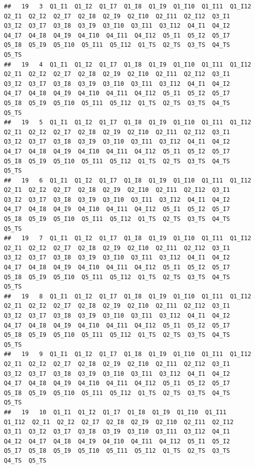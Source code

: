 \documentclass[]{book}
\begin{document}
\begin{verbatim}
##   19   3  Q1_I1  Q1_I2  Q1_I7  Q1_I8  Q1_I9  Q1_I10  Q1_I11  Q1_I12  Q2_I1  Q2_I2  Q2_I7  Q2_I8  Q2_I9  Q2_I10  Q2_I11  Q2_I12  Q3_I1  Q3_I2  Q3_I7  Q3_I8  Q3_I9  Q3_I10  Q3_I11  Q3_I12  Q4_I1  Q4_I2  Q4_I7  Q4_I8  Q4_I9  Q4_I10  Q4_I11  Q4_I12  Q5_I1  Q5_I2  Q5_I7  Q5_I8  Q5_I9  Q5_I10  Q5_I11  Q5_I12  Q1_TS  Q2_TS  Q3_TS  Q4_TS  Q5_TS
##   19   4  Q1_I1  Q1_I2  Q1_I7  Q1_I8  Q1_I9  Q1_I10  Q1_I11  Q1_I12  Q2_I1  Q2_I2  Q2_I7  Q2_I8  Q2_I9  Q2_I10  Q2_I11  Q2_I12  Q3_I1  Q3_I2  Q3_I7  Q3_I8  Q3_I9  Q3_I10  Q3_I11  Q3_I12  Q4_I1  Q4_I2  Q4_I7  Q4_I8  Q4_I9  Q4_I10  Q4_I11  Q4_I12  Q5_I1  Q5_I2  Q5_I7  Q5_I8  Q5_I9  Q5_I10  Q5_I11  Q5_I12  Q1_TS  Q2_TS  Q3_TS  Q4_TS  Q5_TS
##   19   5  Q1_I1  Q1_I2  Q1_I7  Q1_I8  Q1_I9  Q1_I10  Q1_I11  Q1_I12  Q2_I1  Q2_I2  Q2_I7  Q2_I8  Q2_I9  Q2_I10  Q2_I11  Q2_I12  Q3_I1  Q3_I2  Q3_I7  Q3_I8  Q3_I9  Q3_I10  Q3_I11  Q3_I12  Q4_I1  Q4_I2  Q4_I7  Q4_I8  Q4_I9  Q4_I10  Q4_I11  Q4_I12  Q5_I1  Q5_I2  Q5_I7  Q5_I8  Q5_I9  Q5_I10  Q5_I11  Q5_I12  Q1_TS  Q2_TS  Q3_TS  Q4_TS  Q5_TS
##   19   6  Q1_I1  Q1_I2  Q1_I7  Q1_I8  Q1_I9  Q1_I10  Q1_I11  Q1_I12  Q2_I1  Q2_I2  Q2_I7  Q2_I8  Q2_I9  Q2_I10  Q2_I11  Q2_I12  Q3_I1  Q3_I2  Q3_I7  Q3_I8  Q3_I9  Q3_I10  Q3_I11  Q3_I12  Q4_I1  Q4_I2  Q4_I7  Q4_I8  Q4_I9  Q4_I10  Q4_I11  Q4_I12  Q5_I1  Q5_I2  Q5_I7  Q5_I8  Q5_I9  Q5_I10  Q5_I11  Q5_I12  Q1_TS  Q2_TS  Q3_TS  Q4_TS  Q5_TS
##   19   7  Q1_I1  Q1_I2  Q1_I7  Q1_I8  Q1_I9  Q1_I10  Q1_I11  Q1_I12  Q2_I1  Q2_I2  Q2_I7  Q2_I8  Q2_I9  Q2_I10  Q2_I11  Q2_I12  Q3_I1  Q3_I2  Q3_I7  Q3_I8  Q3_I9  Q3_I10  Q3_I11  Q3_I12  Q4_I1  Q4_I2  Q4_I7  Q4_I8  Q4_I9  Q4_I10  Q4_I11  Q4_I12  Q5_I1  Q5_I2  Q5_I7  Q5_I8  Q5_I9  Q5_I10  Q5_I11  Q5_I12  Q1_TS  Q2_TS  Q3_TS  Q4_TS  Q5_TS
##   19   8  Q1_I1  Q1_I2  Q1_I7  Q1_I8  Q1_I9  Q1_I10  Q1_I11  Q1_I12  Q2_I1  Q2_I2  Q2_I7  Q2_I8  Q2_I9  Q2_I10  Q2_I11  Q2_I12  Q3_I1  Q3_I2  Q3_I7  Q3_I8  Q3_I9  Q3_I10  Q3_I11  Q3_I12  Q4_I1  Q4_I2  Q4_I7  Q4_I8  Q4_I9  Q4_I10  Q4_I11  Q4_I12  Q5_I1  Q5_I2  Q5_I7  Q5_I8  Q5_I9  Q5_I10  Q5_I11  Q5_I12  Q1_TS  Q2_TS  Q3_TS  Q4_TS  Q5_TS
##   19   9  Q1_I1  Q1_I2  Q1_I7  Q1_I8  Q1_I9  Q1_I10  Q1_I11  Q1_I12  Q2_I1  Q2_I2  Q2_I7  Q2_I8  Q2_I9  Q2_I10  Q2_I11  Q2_I12  Q3_I1  Q3_I2  Q3_I7  Q3_I8  Q3_I9  Q3_I10  Q3_I11  Q3_I12  Q4_I1  Q4_I2  Q4_I7  Q4_I8  Q4_I9  Q4_I10  Q4_I11  Q4_I12  Q5_I1  Q5_I2  Q5_I7  Q5_I8  Q5_I9  Q5_I10  Q5_I11  Q5_I12  Q1_TS  Q2_TS  Q3_TS  Q4_TS  Q5_TS
##   19   10  Q1_I1  Q1_I2  Q1_I7  Q1_I8  Q1_I9  Q1_I10  Q1_I11  Q1_I12  Q2_I1  Q2_I2  Q2_I7  Q2_I8  Q2_I9  Q2_I10  Q2_I11  Q2_I12  Q3_I1  Q3_I2  Q3_I7  Q3_I8  Q3_I9  Q3_I10  Q3_I11  Q3_I12  Q4_I1  Q4_I2  Q4_I7  Q4_I8  Q4_I9  Q4_I10  Q4_I11  Q4_I12  Q5_I1  Q5_I2  Q5_I7  Q5_I8  Q5_I9  Q5_I10  Q5_I11  Q5_I12  Q1_TS  Q2_TS  Q3_TS  Q4_TS  Q5_TS

\end{verbatim}
\end{document}
